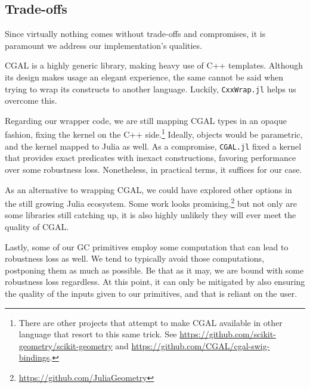 \subsection{Trade-offs}%
\label{sec:solution.tradeoffs}

Since virtually nothing comes without trade-offs and compromises, it is
paramount we address our implementation's qualities.

\Ac{CGAL} is a highly generic library, making heavy use of C++ templates.
Although its design makes usage an elegant experience, the same cannot be said
when trying to wrap its constructs to another language. Luckily,
\texttt{CxxWrap.jl} helps us overcome this.

Regarding our wrapper code, we are still mapping \ac{CGAL} types in an opaque
fashion, fixing the kernel on the C++ side.\footnote{There are other projects
that attempt to make \ac{CGAL} available in other language that resort to this
same trick. See \url{https://github.com/scikit-geometry/scikit-geometry} and
\url{https://github.com/CGAL/cgal-swig-bindings}.} Ideally, objects would be
parametric, and the kernel mapped to Julia as well.  As a compromise,
\texttt{CGAL.jl} fixed a kernel that provides exact predicates with inexact
constructions, favoring performance over some robustness loss.  Nonetheless, in
practical terms, it suffices for our case.

As an alternative to wrapping \ac{CGAL}, we could have explored other options in
the still growing Julia ecosystem.  Some work looks
promising,\footnote{\url{https://github.com/JuliaGeometry}} but not only are
some libraries still catching up, it is also highly unlikely they will ever meet
the quality of \ac{CGAL}.

Lastly, some of our \ac{GC} primitives employ some computation that can lead to
robustness loss as well.  We tend to typically avoid those computations,
postponing them as much as possible.  Be that as it may, we are bound with some
robustness loss regardless.  At this point, it can only be mitigated by also
ensuring the quality of the inputs given to our primitives, and that is reliant
on the user.
